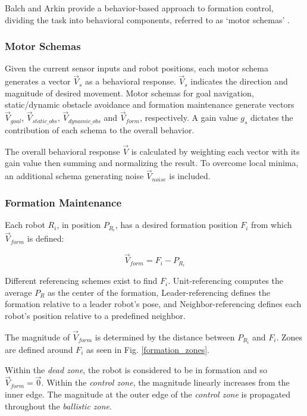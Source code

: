 \documentclass[letterpaper, 10 pt, conference]{ieeeconf}  %
\begin{document}
Balch and Arkin provide a behavior-based approach to formation control, dividing the task into behavioral components, referred to as `motor schemas' \cite{c2}. 

\subsubsection*{Motor Schemas}

Given the current sensor inputs and robot positions, each motor schema generates a vector $\vec{V}_s$ as a behavioral response. $\vec{V}_s$ indicates the direction and magnitude of desired movement. Motor schemas for goal navigation, static/dynamic obstacle avoidance and formation maintenance generate vectors $\vec{V}_{goal}$, $\vec{V}_{static\_obs}$, $\vec{V}_{dynamic\_obs}$ and $\vec{V}_{form}$, respectively. A gain value $g_s$ dictates the contribution of each schema to the overall behavior.

The overall behavioral response $\vec{V}$ is calculated by weighting each vector with its gain value then summing and normalizing the result. To overcome local minima, an additional schema generating noise  $\vec{V}_{noise}$ is included.

\subsubsection*{Formation Maintenance}
Each robot $R_i$, in position $P_{R_i}$, has a desired formation position $F_i$ from which $\vec{V}_{form}$ is defined:

\[\vec{V}_{form} = F_i - P_{R_i}\]

Different referencing schemes exist to find $F_i$. Unit-referencing computes the average $P_R$ as the center of the formation, Leader-referencing defines the formation relative to a leader robot's pose, and Neighbor-referencing defines each robot's position relative to a predefined neighbor.

The magnitude of $\vec{V}_{form}$ is determined by the distance between $P_{R_i}$ and $F_i$. Zones are defined around $F_{i}$ as seen in Fig. \ref{formation_zones}.

Within the \textit{dead zone}, the robot is considered to be in formation and so $\vec{V}_{form} = \vec{0}$. Within the \textit{control zone}, the magnitude linearly increases from the inner edge. The magnitude at the outer edge of the \textit{control zone} is propagated throughout the \textit{ballistic zone}.
\end{document}
